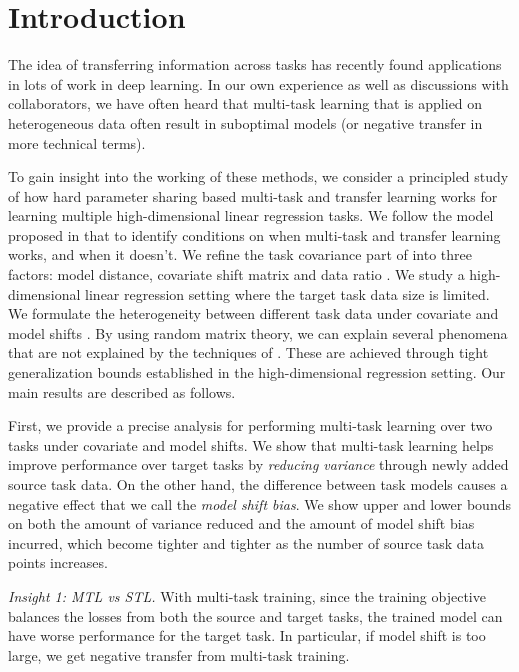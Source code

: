 \section{Introduction}

The idea of transferring information across tasks has recently found applications in lots of work in deep learning.
In our own experience as well as discussions with collaborators, we have often heard that multi-task learning that is applied on heterogeneous data often result in suboptimal models (or negative transfer in more technical terms).

To gain insight into the working of these methods, we consider a principled study of how hard parameter sharing based multi-task and transfer learning works for learning multiple high-dimensional linear regression tasks.
We follow the model proposed in \cite{WZR20} that to identify conditions on when multi-task and transfer learning works, and when it doesn't.
We refine the task covariance part of \cite{WZR20} into three factors: model distance, covariate shift matrix and data ratio \cite{PY09,K18}.
We study a high-dimensional linear regression setting where the target task data size is limited.
We formulate the heterogeneity between different task data under covariate and model shifts .
By using random matrix theory, we can explain several phenomena that are not explained by the techniques of \cite{WZR20}.
These are achieved through tight generalization bounds established in the high-dimensional regression setting.
Our main results are described as follows.

\smallskip
{}
	First, we provide a precise analysis for performing multi-task learning over two tasks under covariate and model shifts.
	We show that multi-task learning helps improve performance over target tasks by \textit{reducing variance} through newly added source task data.
	On the other hand, the difference between task models causes a negative effect that we call the \textit{model shift bias}.
	We show upper and lower bounds on both the amount of variance reduced and the amount of model shift bias incurred, which become tighter and tighter as the number of source task data points increases.

	{\it Insight 1: MTL vs STL.} With multi-task training, since the training objective balances the losses from both the source and target tasks, the trained model can have worse performance for the target task.
	In particular, if model shift is too large, we get negative transfer from multi-task training.

